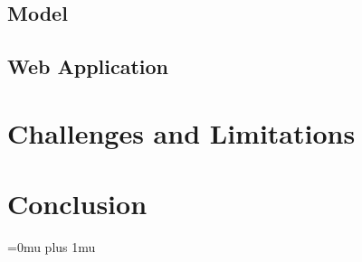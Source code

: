 \documentclass[a4paper, oneside, 11pt]{article}
\begin{document}
\begin{multicols*}{2}
  \subsection{Model}


  \subsection{Web Application}
  


  
  \section{Challenges and Limitations}



  


  \section{Conclusion}
  \lipsum[1]



  \newpage


  \Urlmuskip=0mu plus 1mu\relax
  
  

\end{multicols*}
\end{document}
